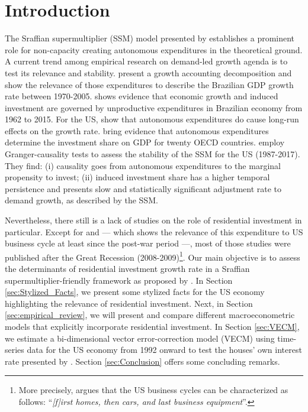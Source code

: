 \section{Introduction}\label{sec:Introduction}

The Sraffian supermultiplier (SSM) model presented by \textcite{serrano_long_1995} establishes a prominent role for non-capacity creating autonomous expenditures in the theoretical ground.
A current trend among empirical research on demand-led growth agenda is to test its  relevance and stability. 
\textcite{freitas_pattern_2013} present a growth accounting decomposition and show the relevance of those expenditures to describe the Brazilian GDP growth rate between 1970-2005. 
\textcite{braga_investment_2018} shows evidence that economic growth and induced investment are governed by unproductive expenditures in Brazilian economy from 1962 to 2015. 
For the US, \textcite{girardi_long-run_2016} show that autonomous expenditures do cause long-run effects on the growth rate. \textcite{girardi_autonomous_2018} bring evidence that autonomous expenditures determine the investment share on GDP for twenty OECD countries. 
\textcite{haluska_growth_2019} employ Granger-causality tests to assess the stability of the SSM for the US (1987-2017). They find: (i) causality goes from autonomous expenditures to the marginal propensity to invest; (ii) induced investment share has a higher temporal persistence and presents slow and statistically significant adjustment rate to demand growth, as described by the SSM.


Nevertheless, there still is a lack of studies on the role of residential investment in particular. 
Except for \textcite{green_follow_1997} and \textcite{leamer_housing_2007} --- which shows the relevance of this expenditure to US business cycle at least since the post-war period ---, most of those studies were published after the Great Recession (2008-2009)\footnote{More precisely, \textcite[p.~8]{leamer_housing_2007} argues that the US business cycles can be characterized as follows: ``\textit{[f]irst homes, then cars, and last business equipment}''.}.
Our main objective is to assess the determinants of residential investment growth rate in a Sraffian supermultiplier-friendly framework as proposed by \textcite{teixeira_crescimento_2015}.
In Section \ref{sec:Stylized_Facts}, we present some stylized facts for the US economy highlighting the relevance of residential investment.
Next, in Section \ref{sec:empirical_review}, we will present and compare different macroeconometric models that explicitly incorporate residential investment.
In Section \ref{sec:VECM}, we estimate a bi-dimensional vector error-correction model (VECM) using time-series data for the US economy from 1992 onward to test the houses' own interest rate presented by \textcite{teixeira_crescimento_2015}. 
Section \ref{sec:Conclusion} offers some concluding remarks.


